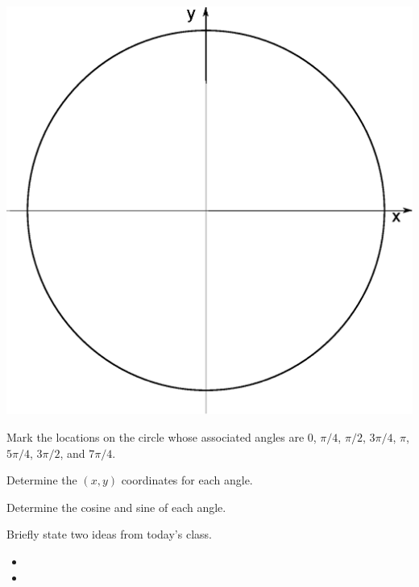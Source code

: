 \begin{problem}
  \includegraphics[width=16cm]{trig/img/blankCircle}

  \begin{subproblem}
  \item Mark the locations on the circle whose associated angles are
    0, $\pi/4$, $\pi/2$, $3\pi/4$, $\pi$, $5\pi/4$, $3\pi/2$, and
    $7\pi/4$.
    \clearpage

  \item Determine the $(x,y)$ coordinates for each angle.
    \vfill
  \item Determine the cosine and sine of each angle.
    \vfill
  \end{subproblem}

\end{problem}

\postClass

\begin{problem}
\item Briefly state two ideas from today's class.
  \begin{itemize}
  \item 
  \item 
  \end{itemize}
\item 
  \begin{subproblem}
    \item
  \end{subproblem}
\end{problem}


